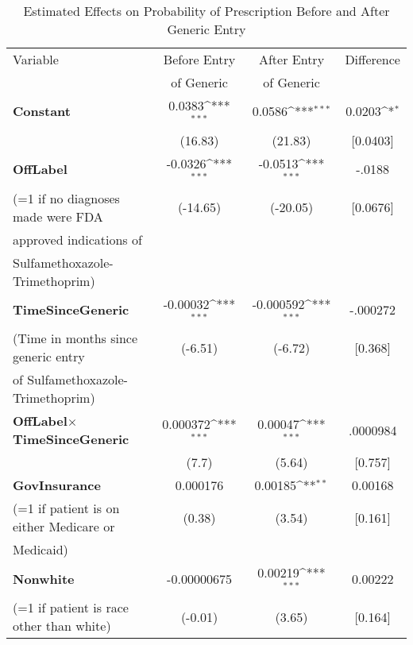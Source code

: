 \begin{table}[htbp]\centering
\def\sym#1{\ifmmode^{#1}\else\(^{#1}\)\fi}
\caption{Estimated Effects on Probability of Prescription Before and After Generic Entry\label{tab1}}
\begin{tabular}{l*{3}{c}}
\hline\hline
Variable  &\multicolumn{1}{c}{Before Entry}&\multicolumn{1}{c}{After Entry}&\multicolumn{1}{c}{Difference}\\
&of Generic&of Generic\\\hline
\textbf{Constant}      &      0.0383\sym{***}&      0.0586\sym{***}&   0.0203\sym{*}\\
            &               (16.83)         &     (21.83)         &    [0.0403]         \\
[.5em]
\textbf{OffLabel}    &                                     -0.0326\sym{***}&     -0.0513\sym{***}&   -.0188\\
(=1 if no diagnoses made were FDA            &    (-14.65)         &    (-20.05)         &    [0.0676]         \\
approved indications of\\
Sulfamethoxazole-Trimethoprim)\\
[.5em]
\textbf{TimeSinceGeneric}&                           -0.00032\sym{***}&   -0.000592\sym{***}&   -.000272\\
(Time in months since generic entry            &     (-6.51)         &     (-6.72)         &     [0.368]         \\
of Sulfamethoxazole-Trimethoprim)\\
[.5em]
\textbf{OffLabel}$\times$\textbf{TimeSinceGeneric} &    0.000372\sym{***}&    0.00047\sym{***}&   .0000984\\
            &                                           (7.7)         &      (5.64)         &    [0.757]         \\
[.5em]
\textbf{GovInsurance}&                                    0.000176         &     0.00185\sym{**} &   0.00168\\
(=1 if patient is on either Medicare or            &      (0.38)         &      (3.54)         &    [0.161]         \\
Medicaid)\\
[.5em]
\textbf{Nonwhite}    &                                    -0.00000675         &     0.00219\sym{***}&   0.00222\\
(=1 if patient is race other than white)            &     (-0.01)         &      (3.65)         &    [0.164]         \\

\end{tabular}
\end{table}
